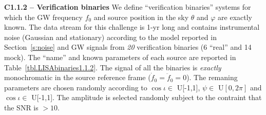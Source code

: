 \documentclass[11pt]{report}
\begin{document}
\begin{description}
\item {\bf C1.1.2 -- Verification binaries} We define ``verification binaries'' systems for which the GW frequency $f_0$ and source position in the sky $\theta$ and $\varphi$ are exactly known. The data stream for this challenge is 1-yr long and contains instrumental noise (Gaussian and stationary) according to the model reported in Section~\ref{s:noise} and GW signals from {\em 20} verification binaries (6 ``real'' and 14 mock). The ``name'' and known parameters of each source are reported in Table~\ref{tbl.LISAbinaries1.1.2}. The signal of all the binaries is {\em exactly} monochromatic in the source reference frame ($\dot{f}_0 = \ddot{f}_0 = 0$). The remaning parameters are chosen randomly according to $\cos\iota\in$ U[-1,1], $\psi \in$ U$[0,2\pi]$ and $\cos\iota\in$ U[-1,1]. The amplitude is selected randomly subject to the contraint that the SNR is $> 10$.



\end{description}
\end{document}
